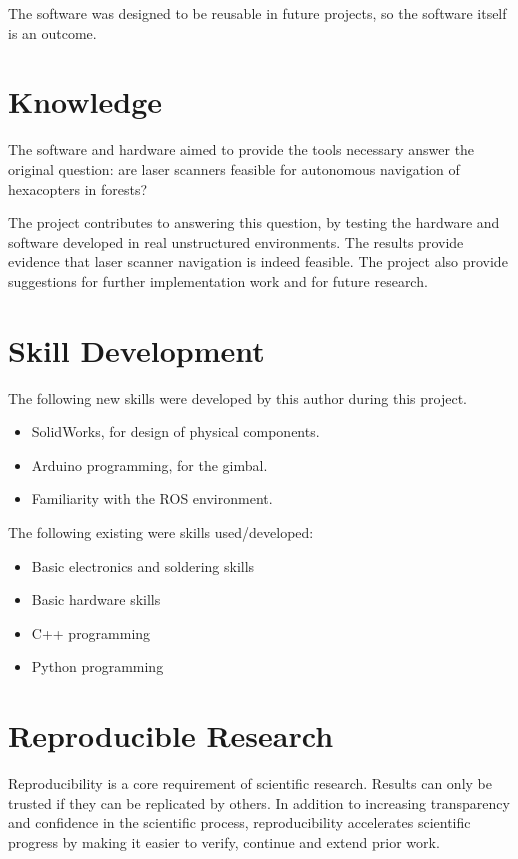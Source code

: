 \documentclass[12pt,oneside,a4paper]{book}
\begin{document}
The software was designed to be reusable in future projects, so the
software itself is an outcome.

\section{Knowledge}
\label{sec:knowledge}

The software and hardware aimed to provide the tools
necessary answer the original question: are laser scanners feasible
for autonomous navigation of hexacopters in forests?

The project contributes to answering this question, by testing the
hardware and software developed in real unstructured environments. The
results provide evidence that laser scanner navigation is indeed
feasible. The project also provide suggestions for further
implementation work and for future research.

\section{Skill Development}
\label{sec:skill-development}

The following new skills were developed by this author during this project.

\begin{itemize}
\item SolidWorks, for design of physical components.
\item Arduino programming, for the gimbal.
\item Familiarity with the \gls{ROS} environment.
 \end{itemize}
 
The following existing were skills used/developed:
\begin{itemize}
\item Basic electronics and soldering skills
\item Basic hardware skills
\item C++ programming
\item Python programming
\end{itemize}

\section{Reproducible Research}
\label{sec:repr-rese}

Reproducibility is a core requirement of scientific research. Results
can only be trusted if they can be replicated by others. In addition
to increasing transparency and confidence in the scientific process,
reproducibility accelerates scientific progress by making it easier to
verify, continue and extend prior work.
\end{document}
